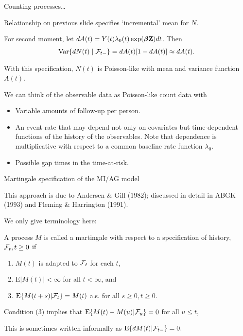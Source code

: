 \documentclass[ignorenonframetext,]{beamer}
\newcommand{\bbeta}{\mbox{\boldmath$\beta$}}
\begin{document}
\begin{frame}{%
\protect\hypertarget{counting-processes-1}{%
Counting processes\ldots}}

Relationship on previous slide specifies `incremental’ mean for \(N\).

For second moment, let
\(dA(t) = Y(t) \lambda_0 (t) \exp(\bbeta {\bf Z}) dt\). Then
\[  \mbox{Var} \{dN(t) \mid {\cal F}_{t-}\} = 
    dA(t)[1-dA(t)] \approx dA(t). \]

With this specification, \(N(t)\) is Poisson-like with mean and variance
function \(A(t)\).

We can think of the observable data as Poisson-like count data with

\begin{itemize}
\item
  Variable amounts of follow-up per person.
\item
  An event rate that may depend not only on covariates but
  time-dependent functions of the history of the observables. Note that
  dependence is multiplicative with respect to a common baseline rate
  function \(\lambda_0\).
\item
  Possible gap times in the time-at-risk.
\end{itemize}

\end{frame}

\begin{frame}{%
\protect\hypertarget{martingale-specification-of-the-miag-model}{%
Martingale specification of the MI/AG model}}

This approach is due to Andersen \& Gill (1982); discussed in detail in
ABGK (1993) and Fleming \& Harrington (1991).

We only give terminology here:

A process \(M\) is called a martingale with respect to a specification
of history, \({\cal F}_t, t \ge 0\) if

\begin{enumerate}
[1.]
\item
  \(M(t)\) is adapted to \({\cal F}_t\) for each \(t\),
\item
  \(\mbox{E}|M(t)| < \infty\) for all \(t < \infty\), and
\item
  \(\mbox{E}\{M(t+s)|{\cal F}_t\} = M(t)\) a.s. for all
  \(s\geq 0,t\geq 0\).
\end{enumerate}

Condition (3) implies that \(\mbox{E}\{M(t) - M(u)|{\cal F}_u\} = 0\)
for all \(u \le t\),

This is sometimes written informally as
\(\mbox{E}\{dM(t) | {\cal F}_{t-}\} = 0.\)

\end{frame}
\end{document}

